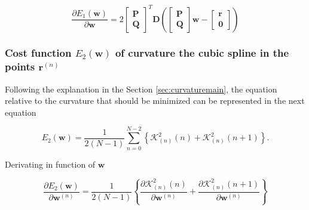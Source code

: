 \begin{equation}\label{eq:DE1}
\frac{\partial E_{1}(\mathbf{w})}{\partial \mathbf{w}}
=
2
\begin{bmatrix}
\mathbf{P}\\
\mathbf{Q}
\end{bmatrix}^{T}
\mathbf{D}
\left(
\begin{bmatrix}
\mathbf{P}\\
\mathbf{Q}
\end{bmatrix}
\mathbf{w}
-
\begin{bmatrix}
\mathbf{r}\\
\mathbf{0}
\end{bmatrix}
\right)
\end{equation}

\subsubsection{Cost function $E_{2}(\mathbf{w})$ of curvature the cubic spline in the points $\mathbf{r}^{(n)}$}

Following the explanation in the Section \ref{sec:curvaturemain},
the equation relative to the curvature that should be minimized can be represented in the next equation




\begin{equation}
E_{2}(\mathbf{w})
=
\frac{1}{2(N-1)}
\sum\limits_{n=0}^{N-2}
\left\{
\mathcal{K}_{(n)}^{2}(n)
+
\mathcal{K}_{(n)}^{2}(n+1)
\right\}.
\end{equation}

Derivating in function of $\mathbf{w}$

\begin{equation}
\frac{\partial E_{2}(\mathbf{w})}{\partial \mathbf{w}^{(n)}}
=
\frac{1}{2(N-1)}
\left\{
\frac{
\partial 
\mathcal{K}_{(n)}^{2}(n)
}{\partial \mathbf{w}^{(n)}}
+
\frac{
\partial 
\mathcal{K}_{(n)}^{2}(n+1)
}{\partial \mathbf{w}^{(n)}}
\right\}
\end{equation}

